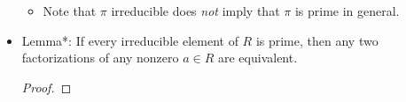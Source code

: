 \documentclass[../notes.tex]{subfiles}
\begin{document}
\begin{itemize}
    \begin{itemize}
        \item Note that $\pi$ irreducible does \emph{not} imply that $\pi$ is prime in general.
    \end{itemize}
    \item Lemma*: If every irreducible element of $R$ is prime, then any two factorizations of any nonzero $a\in R$ are equivalent.
    \begin{proof}




\end{proof}
\end{itemize}
\end{document}
